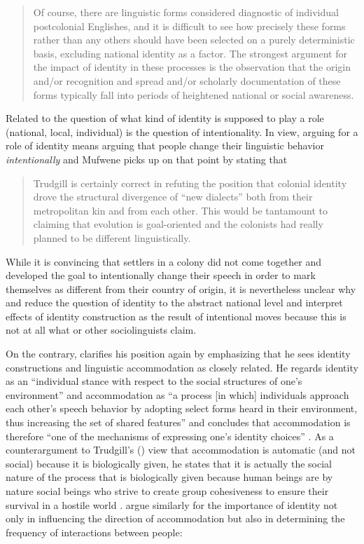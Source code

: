 \begin{quote}
Of course, there are linguistic forms considered diagnostic of individual postcolonial Englishes, and it is difficult to see how precisely these forms rather than any others should have been selected on a purely deterministic basis, excluding national identity as a factor. The strongest argument for the impact of identity in these processes is the observation that the origin and/or recognition and spread and/or scholarly documentation of these forms typically fall into periods of heightened national or social awareness. \citep[266]{Schneider2008b}
\end{quote}

Related to the question of what kind of identity is supposed to play a role (national, local, individual) is the question of intentionality. In  view, arguing for a role of identity means arguing that people change their linguistic behavior \emph{intentionally} and Mufwene picks up on that point by stating that

\begin{quote}
Trudgill is certainly correct in refuting the position that colonial identity drove the structural divergence of “new dialects” both from their metropolitan kin and from each other. This would be tantamount to claiming that evolution is goal-oriented and the colonists had really planned to be different linguistically. \citep[257]{Mufwene2008}
\end{quote}


While it is convincing that settlers in a colony did not come together and developed the goal to intentionally change their speech in order to mark themselves as different from their country of origin, it is nevertheless unclear why \citet{Trudgill2004, Trudgill2008b} and \citet{Mufwene2008} reduce the question of identity to the abstract national level and interpret effects of identity construction as the result of intentional moves because this is not at all what \citet{Schneider2007} or other sociolinguists claim.


On the contrary, \citet[264]{Schneider2008b} clarifies his position again by emphasizing that he sees identity constructions and linguistic accommodation as closely related. He regards identity as an “individual stance with respect to the social structures of one’s environment” and accommodation as “a process [in which] individuals approach each other’s speech behavior by adopting select forms heard in their environment, thus increasing the set of shared features” and concludes that accommodation is therefore “one of the mechanisms of expressing one’s identity choices” \citep[264]{Schneider2008b}. As a counterargument to Trudgill’s (\citeyear{Trudgill2004, Trudgill2008}) view that accommodation is automatic (and not social) because it is biologically given, he states that it is actually the social nature of the process that is biologically given because human beings are by nature social beings who strive to create group cohesiveness to ensure their survival in a hostile world \citep[264]{Schneider2008b}. \citet[275]{Holmes2008} argue similarly for the importance of identity not only in influencing the direction of accommodation but also in determining the frequency of interactions between people:

